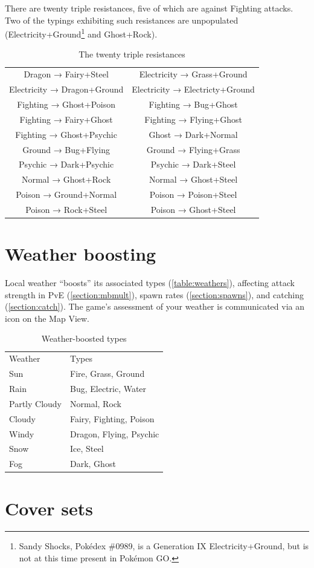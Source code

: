 

There are twenty triple resistances, five of which are against Fighting attacks.
Two of the typings exhibiting such resistances are unpopulated
  (Electricity+Ground\footnote{Sandy Shocks, Pokédex \#0989, is a Generation IX
  Electricity+Ground, but is not at this time present in Pokémon GO.} and Ghost+Rock).
\begin{table}[h]
  \begin{center}
    \begin{tabular}{cc}
Dragon → Fairy+Steel & Electricity → Grass+Ground \\
Electricity → Dragon+Ground & Electricity → Electricty+Ground \\
Fighting → Ghost+Poison & Fighting → Bug+Ghost \\
Fighting → Fairy+Ghost & Fighting → Flying+Ghost \\
Fighting → Ghost+Psychic & Ghost → Dark+Normal \\
Ground → Bug+Flying & Ground → Flying+Grass \\
Psychic → Dark+Psychic & Psychic → Dark+Steel \\
Normal → Ghost+Rock & Normal → Ghost+Steel \\
Poison → Ground+Normal & Poison → Poison+Steel \\
Poison → Rock+Steel & Poison → Ghost+Steel \\
    \end{tabular}
    \caption{The twenty triple resistances}
  \end{center}
\end{table}

\section{Weather boosting}
\label{section:weather}
Local weather ``boosts'' its associated types (\autoref{table:weathers}), affecting attack strength
 in PvE (\autoref{section:mbmult}),
 spawn rates (\autoref{section:spawns}), and catching (\autoref{section:catch}).
The game's assessment of your weather is communicated via an icon on the Map View.
\begin{table}[ht]
\begin{center}
  \begin{tabular}{ll}
    Weather & Types \\
    \Midrule
    Sun & Fire, Grass, Ground \\
    Rain & Bug, Electric, Water \\
    Partly Cloudy & Normal, Rock \\
    Cloudy & Fairy, Fighting, Poison \\
    Windy & Dragon, Flying, Psychic \\
    Snow & Ice, Steel \\
    Fog & Dark, Ghost \\
  \end{tabular}
  \label{table:weather}
  \caption{Weather-boosted types}
\end{center}
\end{table}

\section{Cover sets}
